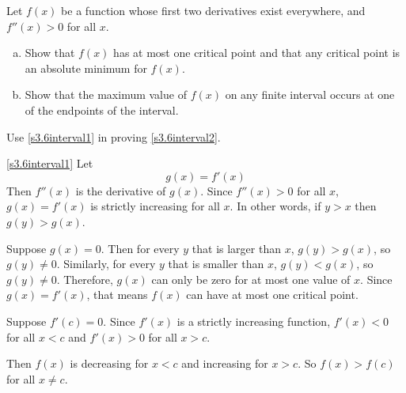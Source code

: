 \begin{Mquestion}[1996D]
Let $f(x)$ be a function whose first two derivatives exist everywhere, and $f''(x)>0$ for all $x$.
\begin{enumerate}[(a)]
 \item\label{s3.6interval1} Show that $f(x)$ has at most one critical point and that any critical point is an absolute minimum for $f(x)$.
  \item\label{s3.6interval2} Show that the maximum value of $f(x)$ on any finite interval
occurs at one of the endpoints of the interval.
\end{enumerate}
\end{Mquestion}
\begin{hint}
Use \eqref{s3.6interval1} in
proving \eqref{s3.6interval2}.
\end{hint}
\begin{answer}
\eqref{s3.6interval1}
Let
\[g(x)=f'(x)\]
Then $f''(x)$ is the derivative of $g(x)$. Since $f''(x)>0$ for all $x$, $g(x)=f'(x)$ is strictly increasing
for all $x$.
In other words, if $y>x$ then $g(y)>g(x)$.

Suppose $g(x)=0$. Then for every $y$ that is larger than $x$, $g(y)>g(x)$, so $g(y) \neq 0$. Similarly, for every $y$ that is smaller than $x$, $g(y)<g(x)$, so $g(y) \neq 0$. Therefore, $g(x)$ can only be zero for at most one value of $x$. Since $g(x)=f'(x)$, that means $f(x)$ can have at most one critical point.

Suppose $f'(c)=0$. Since
$f'(x)$ is a strictly increasing function, $f'(x)<0$ for all $x<c$ and $f'(x)>0$ for all $x>c$.
\begin{center}\end{center}

Then $f(x)$ is decreasing for $x<c$ and increasing for $x>c$.
So $f(x)>f(c)$ for all $x\neq c$.


\end{answer}
